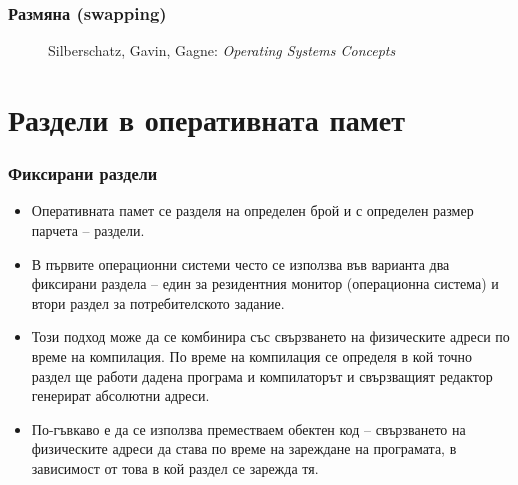 \documentclass[ignorenonframetext, hyperref=unicode]{beamer}
\begin{document}
\begin{frame}
\frametitle{Размяна (swapping)}
\begin{figure}[h]
\center
{}
\caption{Silberschatz, Gavin, Gagne: {\em Operating Systems Concepts}}
\end{figure}
\end{frame}

\section{Раздели в оперативната памет}
\begin{frame}
\frametitle{Фиксирани раздели}
\begin{itemize}
  \item Оперативната памет се разделя на определен брой и с определен размер
  парчета -- раздели.
  \item В първите операционни системи често се използва във варианта два
  фиксирани раздела -- един за резидентния монитор (операционна система) и
  втори раздел за потребителското задание.
  \item Този подход може да се комбинира със свързването на физическите адреси
  по време на компилация. По време на компилация се определя в кой точно раздел
  ще работи дадена програма и компилаторът и свързващият редактор генерират
  абсолютни адреси.
  \item По-гъвкаво е да се използва преместваем обектен код -- свързването на
  физическите адреси да става по време на зареждане на програмата, в зависимост
  от това в кой раздел се зарежда тя.
\end{itemize}
\end{frame}
\end{document}
